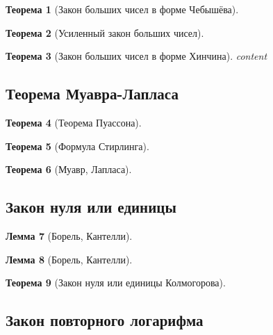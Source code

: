 \documentclass[12pt]{article}
\newtheorem{theorem}{Теорема}
\newtheorem{lemma}[theorem]{Лемма}
\numberwithin{theorem}{section}
\theoremstyle{definition}
\begin{document}
	\begin{theorem}[Закон больших чисел в форме Чебышёва]
		
	\end{theorem}
	
	\begin{theorem}[Усиленный закон больших чисел]
		
	\end{theorem}
	
	\begin{theorem}[Закон больших чисел в форме Хинчина]
		content
	\end{theorem}
	
	\subsection{Теорема Муавра-Лапласа}
	
	\begin{theorem}[Теорема Пуассона]
		
	\end{theorem}
	
	\begin{theorem}[Формула Стирлинга]
		
	\end{theorem}
	
	\begin{theorem}[Муавр, Лапласа]
		
	\end{theorem}
	
	\subsection{Закон нуля или единицы}
	
	\begin{lemma}[Борель, Кантелли]
		
	\end{lemma}
	
	\begin{lemma}[Борель, Кантелли]
		
	\end{lemma}
	
	\begin{theorem}[Закон нуля или единицы Колмогорова]
		
	\end{theorem}
	
	\subsection{Закон повторного логарифма}
	
\end{document}
